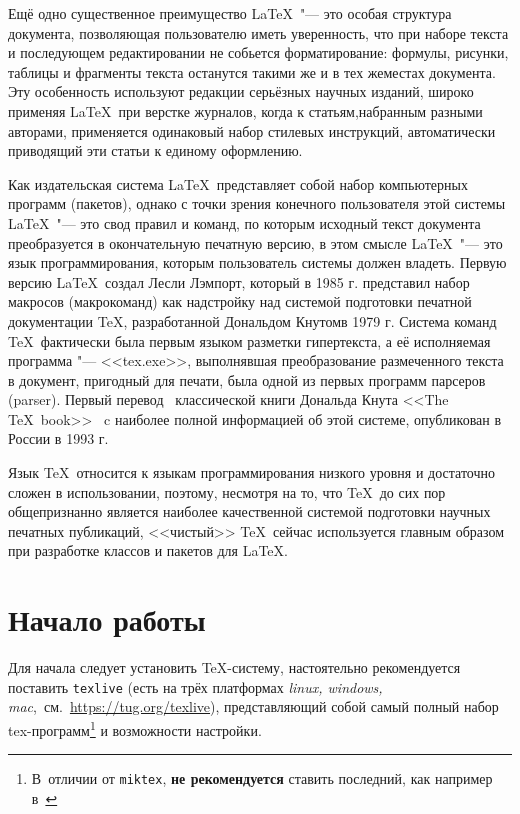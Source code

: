 ﻿\documentclass[psamsfonts, intlimits, sumlimits, namelimits, 12pt, a4paper]{article}
\begin{document}
Ещё одно существенное преимущество \LaTeX\ "--- это особая структура документа, позволяющая пользователю иметь уверенность, что при наборе текста и последующем редактировании не собьется форматирование: формулы, рисунки, таблицы и фрагменты текста останутся такими же и в тех жеместах документа. Эту особенность используют редакции серьёзных научных изданий, широко применяя \LaTeX\ при верстке журналов, когда к статьям,набранным разными авторами, применяется одинаковый набор стилевых инструкций, автоматически приводящий эти статьи к единому оформлению.

Как издательская система \LaTeX\ представляет собой набор компьютерных программ (пакетов), однако с точки зрения конечного пользователя этой системы \LaTeX\ "--- это свод правил и команд, по которым исходный текст документа преобразуется в окончательную печатную версию, в этом смысле \LaTeX\ "--- это язык программирования, которым пользователь системы должен владеть. Первую версию \LaTeX\ создал Лесли Лэмпорт, который в 1985 г. представил набор макросов (макрокоманд) как надстройку над системой подготовки печатной документации \TeX, разработанной Дональдом Кнутомв 1979 г. Система команд \TeX\ фактически была первым языком разметки гипертекста, а её исполняемая программа "--- <<tex.exe>>, выполнявшая преобразование размеченного текста в документ, пригодный для печати, была одной из первых программ парсеров (parser). Первый перевод~\cite{knut:book:1993:01} классической книги Дональда Кнута <<The \TeX\ book>>~\cite{knut:book:1984:01} c наиболее полной информацией об этой системе, опубликован в России в 1993 г.

Язык \TeX\ относится к языкам программирования низкого уровня и достаточно сложен в использовании, поэтому, несмотря на то, что \TeX\ до сих пор общепризнанно является наиболее качественной системой подготовки научных печатных публикаций, <<чистый>> \TeX\ сейчас используется главным образом при разработке классов и пакетов для \LaTeX.



\section{Начало работы}
\label{sec:nachalo_raboty}


Для начала следует установить \TeX-систему, настоятельно рекомендуется поставить \texttt{texlive} (есть на трёх платформах \textit{linux, windows, mac},~см.~\url{https://tug.org/texlive}), представляющий собой самый полный набор tex\nobreak-программ\footnote{В отличии от \texttt{miktex}, \textbf{не рекомендуется} ставить последний, как например в~\cite{nasyrov:book:2019:01}} и возможности настройки.
\end{document}
